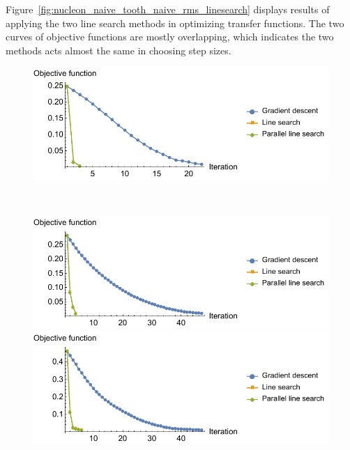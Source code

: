 Figure~\ref{fig:nucleon_naive_tooth_naive_rms_linesearch} displays results of applying the two line search methods in optimizing transfer functions. The two curves of objective functions are mostly overlapping, which indicates the two methods acts almost the same in choosing step sizes.

\begin{figure}
	\centering
	\begin{minipage}{.5\textwidth}
		\includegraphics[width=1\linewidth]{figures/nucleon_naive_proportional_rms_fixed_linesearch_parallel}
		\subcaption{}
	\end{minipage}~
	\begin{minipage}{.5\textwidth}
		\includegraphics[width=1\linewidth]{figures/tooth_naive_rms_fixed_linesearch_parallel}
		\subcaption{}
	\end{minipage}
	\begin{minipage}{.5\textwidth}
		\includegraphics[width=1\linewidth]{figures/CT-Knee_naive_rms_fixed_linesearch_parallel}
		\subcaption{}
	\end{minipage}~

\end{figure}
